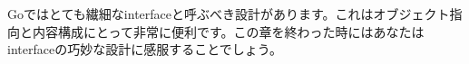 Goではとても繊細なinterfaceと呼ぶべき設計があります。これはオブジェクト指向と内容構成にとって非常に便利です。この章を終わった時にはあなたはinterfaceの巧妙な設計に感服することでしょう。

